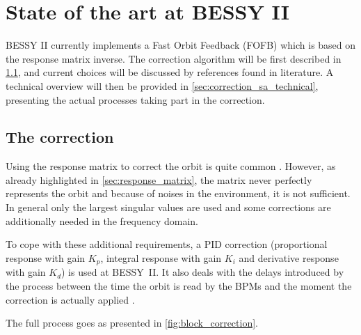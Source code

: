 \section{State of the art at BESSY II}
\label{sec:correction_state_of_art}
BESSY II currently implements a Fast Orbit Feedback (FOFB) which is based on the response matrix inverse. The correction algorithm will be first described in \cref{sec:correction_sa_corr}, and current choices will be discussed by references found in literature. A technical overview will then be provided in \cref{sec:correction_sa_technical}, presenting the actual processes taking part in the correction.

\subsection{The correction}
\label{sec:correction_sa_corr}
Using the response matrix to correct the orbit is quite common \cite{book:wille,art:plouviez-1999,art:li-2001}. However, as already highlighted in \cref{sec:response_matrix}, the matrix never perfectly represents the orbit and because of noises in the environment, it is not sufficient. In general only the largest singular values are used and some corrections are additionally needed in the frequency domain.

To cope with these additional requirements, a PID correction (proportional response with gain $K_p$, integral response with gain $K_i$ and derivative response with gain $K_d$) is used at BESSY~II. It also deals with the delays introduced by the process between the time the orbit is read by the BPMs and the moment the correction is actually applied \cite{art:plouviez-1999}.

The full process goes as presented in \cref{fig:block_correction}.

